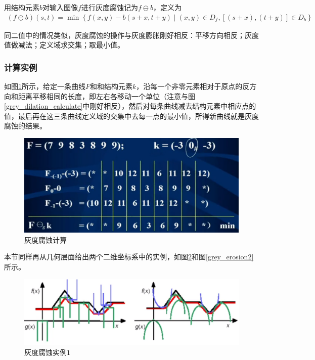 \documentclass[UTF8]{ctexart}
\begin{document}
            \indent 用结构元素$b$对输入图像$f$进行灰度腐蚀记为$f \ominus b$，定义为
                        \begin{align}
                            \left( f \ominus b \right)\left( s, t \right) = \min \left\{ f\left( x, y \right) - b\left( s+x, t+y \right)  \mid \left( x, y \right) \in D_f, \left[ \left( s+x \right), \left( t+y \right) \right] \in D_b \right\} 
                        \end{align}
                        
            \indent 同二值中的情况类似，灰度腐蚀的操作与灰度膨胀刚好相反：平移方向相反；灰度值做减法；定义域求交集；取最小值。
            
            \subsubsection{计算实例}
            
                \indent 如图\ref{grey_erosion_calculation}所示，给定一条曲线$F$和和结构元素$k$，沿每一个非零元素相对于原点的反方向和距离平移相同的长度，即左右各移动一个单位（注意与图\ref{grey_dilation_calculate}中刚好相反），然后对每条曲线减去结构元素中相应点的值，最后再在这三条曲线定义域的交集中去每一点的最小值，所得新曲线就是灰度腐蚀的结果。

                			\begin{figure}[H]
                				\centering 
                				\includegraphics[scale=0.3]{grey_erosion_calculation.png} 
                				\caption{灰度腐蚀计算} 
                				\label{grey_erosion_calculation}
                			\end{figure}                
                
                \indent 本节同样再从几何层面给出两个二维坐标系中的实例，如图\ref{grey_erosion1}和图\ref{grey_erosion2}所示。

                			\begin{figure}[H]
                				\centering 
                				\includegraphics[scale=0.3]{grey_erosion.png} 
                				\caption{灰度腐蚀实例$1$} 
                				\label{grey_erosion1}
                			\end{figure}	
\end{document}
